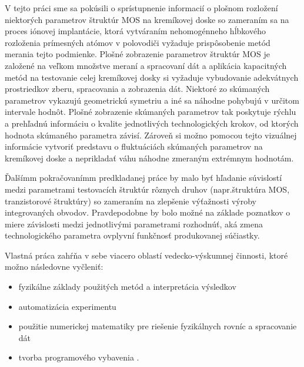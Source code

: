 \par V tejto práci sme sa pokúsili o sprístupnenie informacií o
plošnom rozložení niektorých parametrov štruktúr MOS na kremíkovej
doske so zameraním sa na proces iónovej implantácie, ktorá vytváraním
nehomogénneho hĺbkového rozloženia prímesných atómov v polovodiči
vyžaduje prispôsobenie metód merania tejto podmienke. Plošné
zobrazenie parametrov štruktúr MOS je založené na veľkom množstve
meraní a spracovaní dát a aplikácia kapacitných metód na testovanie
celej kremíkovej dosky si vyžaduje vybudovanie adekvátnych
prostriedkov zberu, spracovania a zobrazenia dát. Niektoré zo
skúmaných parametrov vykazujú geometrickú symetriu a iné sa náhodne
pohybujú v určitom intervale hodnôt. Plošné zobrazenie skúmaných
parametrov tak poskytuje rýchlu a prehľadnú informáciu o kvalite
jednotlivých technologických krokov, od ktorých hodnota skúmaného
parametra závisí. Zároveň si možno pomocou tejto vizuálnej informácie
vytvoriť predstavu o fluktuáciách skúmaných parametrov na kremíkovej
doske a neprikladať váhu náhodne zmeraným extrémnym hodnotám.

\par Ďalšímm pokračovanímm predkladanej práce by malo byť hľadanie
súvislostí medzi parametrami testovacích štruktúr rôznych druhov
(napr.štruktúra MOS, tranzistorové štruktúry) so zameraním na
zlepšenie výťažnosti výroby integrovaných obvodov. Pravdepodobne by
bolo možné na základe poznatkov o miere závislosti medzi jednotlivými
parametrami rozhodnúť, aká zmena technologického parametra ovplyvní
funkčnosť produkovanej súčiastky.

\par
Vlastná práca zahŕňa v sebe viacero oblastí vedecko-výskumnej
činnosti, ktoré možno následovne vyčleniť:
\begin{itemize}
\item{fyzikálne základy použitých metód a interpretácia výsledkov}
\item{automatizácia experimentu}
\item{použitie numerickej  matematiky pre riešenie fyzikálnych rovníc a spracovanie dát}
\item{tvorba programového vybavenia} .
\end{itemize}

